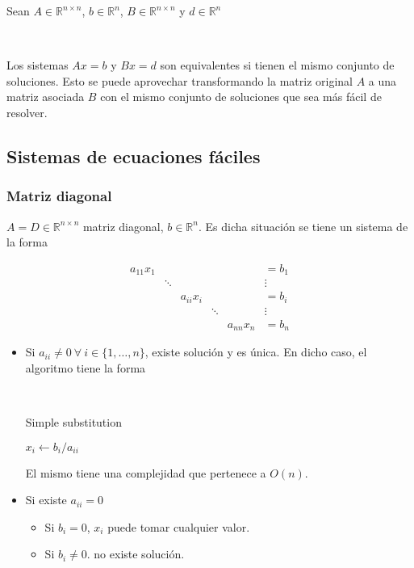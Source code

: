Sean $A \in \mathbb{R}^{n \times n}$, $b \in \mathbb{R}^{n}$, $B \in \mathbb{R}^{n \times n}$ y $d \in \mathbb{R}^{n}$

\

Los sistemas $Ax = b$ y $Bx = d$ son equivalentes si tienen el mismo conjunto de soluciones. Esto se puede aprovechar transformando la matriz original $A$ a una matriz asociada $B$ con el mismo conjunto de soluciones que sea más fácil de resolver.

\subsection{Sistemas de ecuaciones fáciles} 
\label{subsec:sistemas_de_ecuaciones_faciles}

\subsubsection{Matriz diagonal}
\label{subsubsec:matriz_diagonal}

$A = D \in \mathbb{R}^{n \times n}$ matriz diagonal, $b \in \mathbb{R}^{n}$. Es dicha situación se tiene un sistema de la forma

\[
\begin{matrix}
a_{11}x_{1} &  &  &  &  & = b_1 \\
 & \ddots &  & &  & \vdots \\
 & & a_{ii}x_{i} & & & = b_{i} \\
 & &  & \ddots & & \vdots \\
 & & & & a_{nn}x_n & = b_n
\end{matrix}
\]

\begin{itemize}
    \item Si $a_{ii} \neq 0 ~\forall~ i \in \{1,\ldots,n\}$, existe solución y es única. En dicho caso, el algoritmo tiene la forma
    
    \
    
    \begin{algorithm}
    \caption{Simple substitution}
    \label{alg:simple_substitution}
    \begin{algorithmic}
        \State $x_i \gets b_i/a_{ii}$    
    \EndFor
    \end{algorithmic}
    \end{algorithm}
    
    El mismo tiene una complejidad que pertenece a $O(n)$.
    
    \item Si existe $a_{ii} = 0$
    \begin{itemize}
        \item Si $b_{i} = 0$, $x_i$ puede tomar cualquier valor.
        \item Si $b_{i} \neq 0$. no existe solución.
    \end{itemize}
    
\end{itemize}

